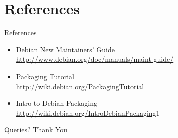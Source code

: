 \documentclass[red,10pt,a4paper]{beamer}
\begin{document}
\section{References}

\begin{frame}{References}
 \begin{itemize}
  \item Debian New Maintainers' Guide \\ \alert{\url{http://www.debian.org/doc/manuals/maint-guide/}}
  \item Packaging Tutorial \\ \alert{\url{http://wiki.debian.org/PackagingTutorial}}
  \item Intro to Debian Packaging \\ \alert{\url{http://wiki.debian.org/IntroDebianPackaging}}1
 \end{itemize}

\end{frame}

\begin{frame}
 \begin{center}
  {\Huge Queries?} \hbr \pause 
  {\Huge Thank You}
 \end{center}

\end{frame}
\end{document}
